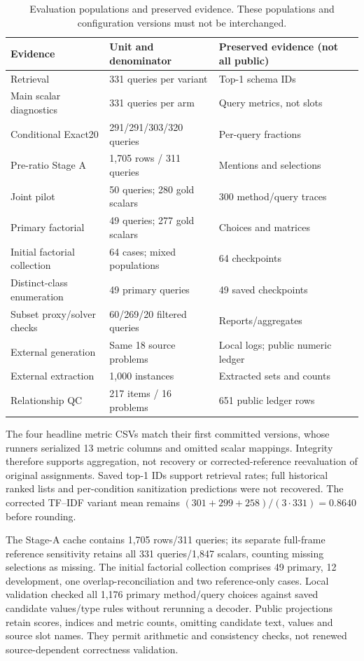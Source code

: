 \begin{table}[htbp]
\centering\small
\caption{Evaluation populations and preserved evidence. These populations
and configuration versions must not be interchanged.}
\label{tab:population-map}
\begin{tabularx}{\linewidth}{@{}lXl@{}}
\toprule
Evidence & Unit and denominator & Preserved evidence (not all public)\\
\midrule
Retrieval & 331 queries per variant & Top-1 schema IDs\\
Main scalar diagnostics & 331 queries per arm & Query metrics, not slots\\
Conditional Exact20 & 291/291/303/320 queries & Per-query fractions\\
Pre-ratio Stage A & 1,705 rows / 311 queries & Mentions and selections\\
Joint pilot & 50 queries; 280 gold scalars & 300 method/query traces\\
Primary factorial & 49 queries; 277 gold scalars & Choices and matrices\\
Initial factorial collection & 64 cases; mixed populations & 64 checkpoints\\
Distinct-class enumeration & 49 primary queries & 49 saved checkpoints\\
Subset proxy/solver checks & 60/269/20 filtered queries & Reports/aggregates\\
External generation & Same 18 source problems & Local logs; public numeric ledger\\
External extraction & 1,000 instances & Extracted sets and counts\\
Relationship QC & 217 items / 16 problems & 651 public ledger rows\\
\bottomrule
\end{tabularx}
\end{table}

The four headline metric CSVs match their first committed versions, whose runners serialized 13 metric columns and omitted scalar mappings. Integrity therefore supports aggregation, not recovery or corrected-reference reevaluation of original assignments. Saved top-1 IDs support retrieval rates; full historical ranked lists and per-condition sanitization predictions were not recovered. The corrected TF--IDF variant mean remains $(301+299+258)/(3\cdot331)=0.8640$ before rounding.

The Stage-A cache contains 1,705 rows/311 queries; its separate full-frame reference sensitivity retains all 331 queries/1,847 scalars, counting missing selections as missing. The initial factorial collection comprises 49 primary, 12 development, one overlap-reconciliation and two reference-only cases. Local validation checked all 1,176 primary method/query choices against saved candidate values/type rules without rerunning a decoder. Public projections retain scores, indices and metric counts, omitting candidate text, values and source slot names. They permit arithmetic and consistency checks, not renewed source-dependent correctness validation.

